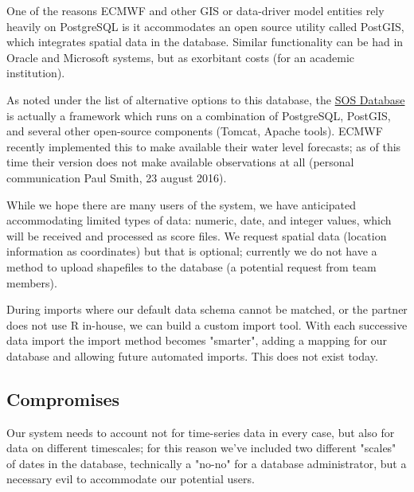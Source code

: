\documentclass[logos,parttoc,morelanguage=french,morelanguage=german]{orsay-memoire}
\begin{document}
One of the reasons ECMWF and other GIS or data-driver model entities rely heavily on PostgreSQL is it accommodates an open source utility called PostGIS, which integrates spatial data in the database. Similar functionality can be had in Oracle and Microsoft systems, but as exorbitant costs (for an academic institution).

As noted under the list of alternative options to this database, the \href{http://52north.org/473-52-north-sos-4-3-7-now-available}{SOS Database} is actually a framework which runs on a combination of PostgreSQL, PostGIS, and several other open-source components (Tomcat, Apache tools). ECMWF recently implemented this to make available their water level forecasts; as of this time their version does not make available observations at all (personal communication Paul Smith, 23 august 2016).

%
%

While we hope there are many users of the system, we have anticipated accommodating limited types of data: numeric, date, and integer values, which will be received and processed as score files. We request spatial data (location information as coordinates) but that is optional; currently we do not have a method to upload shapefiles to the database (a potential request from team members).

During imports where our default data schema cannot be matched, or the partner does not use R in-house, we can build a custom import tool. With each successive data import the import method becomes "smarter", adding a mapping for our database and allowing future automated imports. This does not exist today.
%
%

\subsection{Compromises}

Our system needs to account not for time-series data in every case, but also for data on different timescales; for this reason we've included two different "scales" of dates in the database, technically a "no-no" for a database administrator, but a necessary evil to accommodate our potential users.
\end{document}
